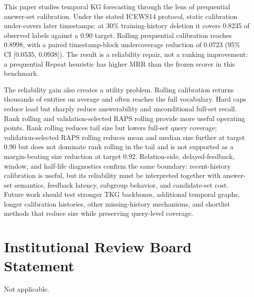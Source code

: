 \documentclass[information,article,submit,oneauthor,pdftex]{Definitions/mdpi}
\begin{document}
This paper studies temporal KG forecasting through the lens of prequential
answer-set calibration. Under the stated ICEWS14 protocol, static calibration
under-covers later timestamps: at 30\% training-history deletion it covers
0.8235 of observed labels against a 0.90 target. Rolling prequential
calibration reaches 0.8998, with a paired timestamp-block undercoverage
reduction of 0.0723 (95\% CI [0.0535, 0.0938]). The result is a reliability
repair, not a ranking improvement: a prequential Repeat heuristic has higher
MRR than the frozen scorer in this benchmark.

The reliability gain also creates a utility problem. Rolling calibration
returns thousands of entities on average and often reaches the full vocabulary.
Hard caps reduce load but sharply reduce answerability and unconditional
full-set recall. Rank rolling and validation-selected RAPS rolling provide more
useful operating points. Rank rolling reduces tail size but lowers full-set
query coverage; validation-selected RAPS rolling reduces mean and median size
further at target 0.90 but does not dominate rank rolling in the tail and is
not supported as a margin-beating size reduction at target 0.92. Relation-side,
delayed-feedback, window, and half-life diagnostics confirm the same boundary:
recent-history calibration is useful, but its reliability must be interpreted
together with answer-set semantics, feedback latency, subgroup behavior, and
candidate-set cost. Future work should test stronger TKG backbones, additional
temporal graphs, longer calibration histories, other missing-history mechanisms,
and shortlist methods that reduce size while preserving query-level coverage.

\fi


\vspace{6pt}



\section*{Institutional Review Board Statement}
Not applicable.
\end{document}
